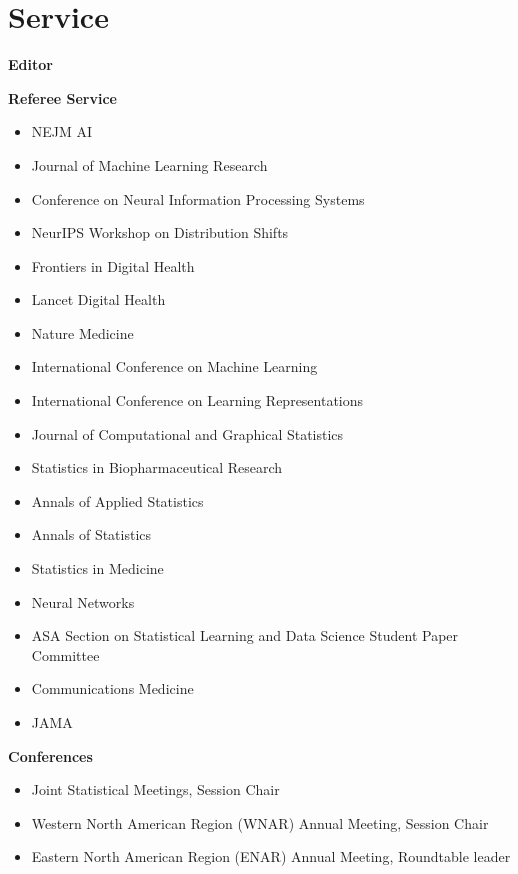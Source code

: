 \documentclass[11pt,a4paper,sans]{moderncv}        %
\begin{document}
\section{Service}
\textbf{Editor}


\textbf{Referee Service}
\begin{itemize}
	\item NEJM AI %
	\item Journal of Machine Learning Research %
	\item Conference on Neural Information Processing Systems %
	\item NeurIPS Workshop on Distribution Shifts %
	\item Frontiers in Digital Health %
	\item Lancet Digital Health %
	\item Nature Medicine %
        \item International Conference on Machine Learning %
        \item International Conference on Learning Representations %
	\item Journal of Computational and Graphical Statistics %
	\item Statistics in Biopharmaceutical Research %
	\item Annals of Applied Statistics %
	\item Annals of Statistics %
	\item Statistics in Medicine %
	\item Neural Networks %
	\item ASA Section on Statistical Learning and Data Science Student Paper Committee %
	\item Communications Medicine %
	\item JAMA
\end{itemize}

\textbf{Conferences}
\begin{itemize}
\item Joint Statistical Meetings, Session Chair
\item Western North American Region (WNAR) Annual Meeting, Session Chair
\item Eastern North American Region (ENAR) Annual Meeting, Roundtable leader
\end{itemize}
\end{document}
